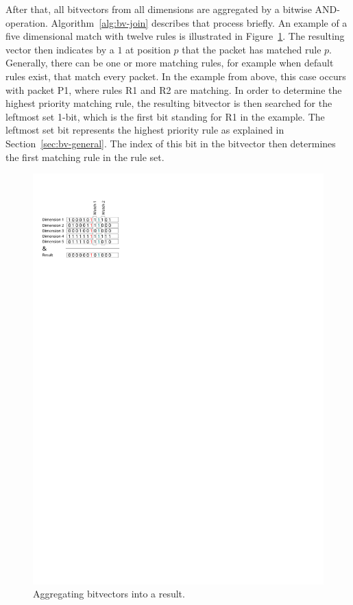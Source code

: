 \documentclass[a4paper,
		12pt,
		parskip=full,
		titlepage
		]{scrartcl}
\begin{document}
After that, all bitvectors from all dimensions are aggregated by a bitwise AND-operation.
Algorithm~\ref{alg:bv-join} describes that process briefly.
An example of a five dimensional match with twelve rules is illustrated in Figure~\ref{fig:bv-and}.
The resulting vector then indicates by a $1$ at position $p$ that the packet has matched rule $p$.
Generally, there can be one or more matching rules, for example when default rules exist, that match every packet.
In the example from above, this case occurs with packet P1, where rules R1 and R2 are matching.
In order to determine the highest priority matching rule, the resulting 
bitvector is then searched for the leftmost set 1-bit, which is the first bit standing for R1 in the example.
The leftmost set bit represents the highest priority rule as explained in Section~\ref{sec:bv-general}.
The index of this bit in the bitvector then determines the first matching rule in the rule set.

\begin{figure}[H]
\centering
\includegraphics[height=0.3\textheight]{images/matching}
\caption{Aggregating bitvectors into a result.}
\label{fig:bv-and}
\end{figure}
\end{document}

